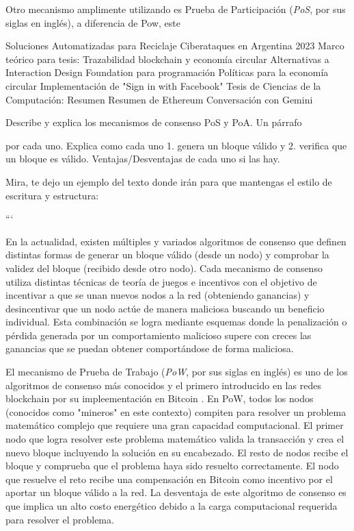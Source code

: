 Otro mecanismo amplimente utilizando es Prueba de Participación (\textit{PoS}, por sus siglas en inglés), a diferencia de Pow, este 

 Soluciones Automatizadas para Reciclaje
Ciberataques en Argentina 2023
Marco teórico para tesis: Trazabilidad blockchain y economía circular
Alternativas a Interaction Design Foundation para programación
Políticas para la economía circular
Implementación de "Sign in with Facebook"
Tesis de Ciencias de la Computación: Resumen
Resumen de Ethereum
Conversación con Gemini

Describe y explica los mecanismos de consenso PoS y PoA. Un párrafo

por cada uno. Explica como cada uno 1. genera un bloque válido y 2. verifica que un bloque es válido. Ventajas/Desventajas de cada uno si las hay.


Mira, te dejo un ejemplo del texto donde irán para que mantengas el estilo de escritura y estructura:


```

En la actualidad, existen múltiples y variados algoritmos de consenso que definen distintas formas de generar un bloque válido (desde un nodo) y comprobar la validez del bloque (recibido desde otro nodo). Cada mecanismo de consenso utiliza distintas técnicas de teoría de juegos e incentivos con el objetivo de incentivar a que se unan nuevos nodos a la red (obteniendo ganancias) y desincentivar que un nodo actúe de manera maliciosa buscando un beneficio individual. Esta combinación se logra mediante esquemas donde la penalización o pérdida generada por un comportamiento malicioso supere con creces las ganancias que se puedan obtener comportándose de forma maliciosa.


El mecanismo de Prueba de Trabajo (\textit{PoW}, por sus siglas en inglés) es uno de los algoritmos de consenso más conocidos y el primero introducido en las redes blockchain por su impleementación en Bitcoin \cite{satoshi2008bitcoin}. En PoW, todos los nodos (conocidos como "mineros" en este contexto) compiten para resolver un problema matemático complejo que requiere una gran capacidad computacional. El primer nodo que logra resolver este problema matemático valida la transacción y crea el nuevo bloque incluyendo la solución en su encabezado. El resto de nodos recibe el bloque y comprueba que el problema haya sido resuelto correctamente. El nodo que resuelve el reto recibe una compensación en Bitcoin como incentivo por el aportar un bloque válido a la red. La desventaja de este algoritmo de consenso es que implica un alto costo energético debido a la carga computacional requerida para resolver el problema.


